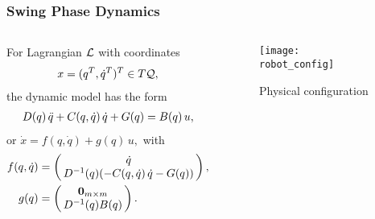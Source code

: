 \begin{frame}
  \frametitle{Swing Phase Dynamics}
  \begin{columns}
    \begin{column}{.55\textwidth}
      For Lagrangian $\mathcal{L}$ with coordinates
      \begin{align*}
        x = (q^{T}, \dot q^{T})^{T} \in T\mathcal{Q},
      \end{align*}
      the dynamic model has the form
      \begin{align*}
        D(q) \, \ddot q + C(q, \dot q) \, \dot q + G(q) = B(q) \, u,
      \end{align*}
      or $\dot x = f(q, \dot q) + g(q) \, u,$ with
      \begin{align*}
        f(\q, \dq) &= \left(\!\!\begin{array}{c}
        \dq\\
        \D^{-1}(\q) (-\C(\q, \dq) \, \dq - \G(\q))
        \end{array}\!\!\right),\\
        g(\q) &= \left(\!\!\begin{array}{c}
        \mathbf{0}_{m \times m}\\
        \D^{-1}(\q) B(\q)
        \end{array}\!\!\right).
      \end{align*}
    \end{column}\!\!
    \begin{column}{.45\textwidth}
      \begin{figure}
        \centering
        \vspace{-10mm}
        \caption{Physical configuration}
        \texttt{[image: robot\_config]}
      \end{figure}
    \end{column}
  \end{columns}
\end{frame}

